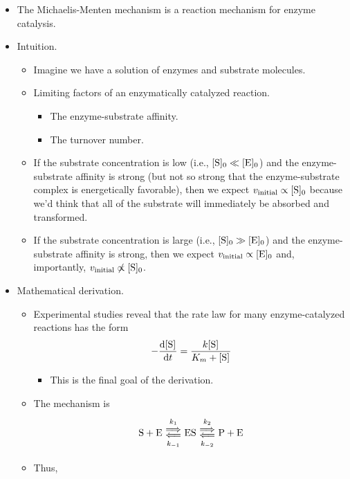 \documentclass[../notes.tex]{subfiles}
\begin{document}
\begin{itemize}
    \item The Michaelis-Menten mechanism is a reaction mechanism for enzyme catalysis.
    \item Intuition.
    \begin{itemize}
        \item Imagine we have a solution of enzymes and substrate molecules.
        \item Limiting factors of an enzymatically catalyzed reaction.
        \begin{itemize}
            \item The enzyme-substrate affinity.
            \item The turnover number.
        \end{itemize}
        \item If the substrate concentration is low (i.e., $\cnc[0]{S}\ll\cnc[0]{E}$) and the enzyme-substrate affinity is strong (but not so strong that the enzyme-substrate complex is energetically favorable), then we expect $v_\text{initial}\propto\cnc[0]{S}$ because we'd think that all of the substrate will immediately be absorbed and transformed.
        \item If the substrate concentration is large (i.e., $\cnc[0]{S}\gg\cnc[0]{E}$) and the enzyme-substrate affinity is strong, then we expect $v_\text{initial}\propto\cnc[0]{E}$ and, importantly, $v_\text{initial}\not\propto\cnc[0]{S}$.
    \end{itemize}
    \item Mathematical derivation.
    \begin{itemize}
        \item Experimental studies reveal that the rate law for many enzyme-catalyzed reactions has the form
        \begin{equation*}
            -\dv{\cnc{S}}{t} = \frac{k\cnc{S}}{K_m+\cnc{S}}
        \end{equation*}
        \begin{itemize}
            \item This is the final goal of the derivation.
        \end{itemize}
        \item The mechanism is
        \begin{equation*}
            \ce{S + E} \Longleftrightarrows[k_1][k_{-1}] \ce{ES}
            \Longleftrightarrows[k_2][k_{-2}] \ce{P + E}
        \end{equation*}
        \item Thus,
        \begin{gather*}

\end{gather*}
\end{itemize}
\end{itemize}
\end{document}
